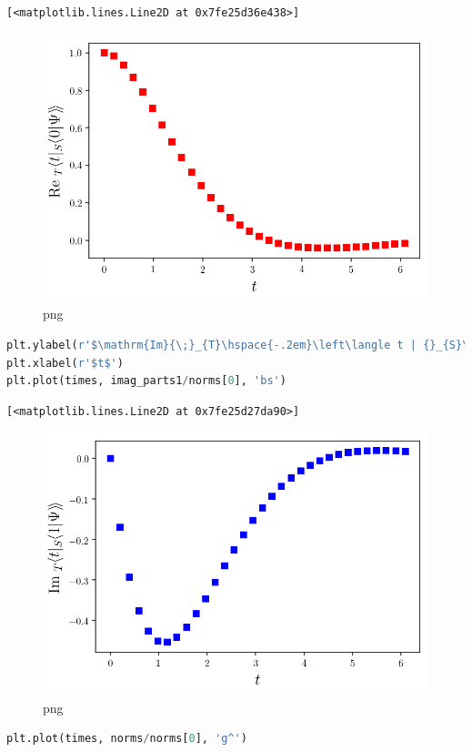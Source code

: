 \begin{lstlisting}
[<matplotlib.lines.Line2D at 0x7fe25d36e438>]
\end{lstlisting}

\begin{figure}
\centering
\includegraphics[width=0.6\linewidth]{output_87_1.png}
\caption[]{png}
\end{figure}

\begin{lstlisting}[language=Python]
plt.ylabel(r'$\mathrm{Im}{\;}_{T}\hspace{-.2em}\left\langle t | {}_{S}\hspace{-.2em}\left\langle 1 | \Psi \right\rangle\hspace{-.17em}\right\rangle $')
plt.xlabel(r'$t$')
plt.plot(times, imag_parts1/norms[0], 'bs')
\end{lstlisting}

\begin{lstlisting}
[<matplotlib.lines.Line2D at 0x7fe25d27da90>]
\end{lstlisting}

\begin{figure}
\centering
\includegraphics[width=0.6\linewidth]{output_88_1.png}
\caption[]{png}
\end{figure}

\begin{lstlisting}[language=Python]
plt.plot(times, norms/norms[0], 'g^')
\end{lstlisting}

